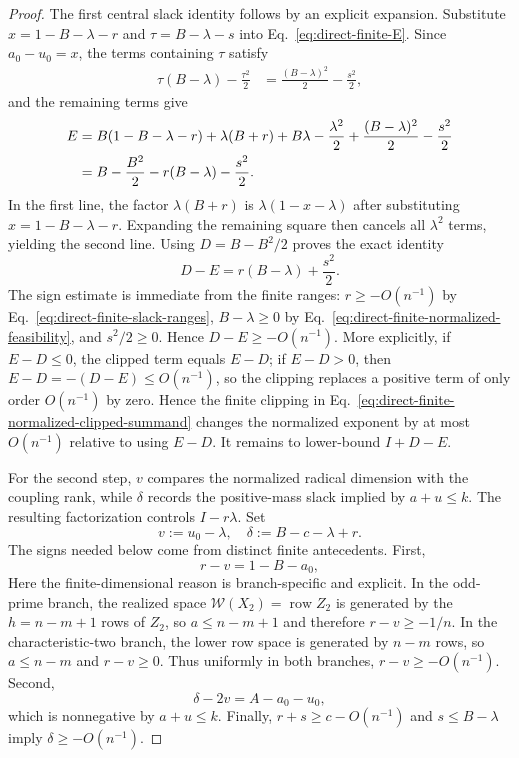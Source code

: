 \documentclass[11pt]{article}
\newcommand{\1}{\mathbf 1}
\theoremstyle{plain}
\theoremstyle{definition}
\theoremstyle{remark}
\begin{document}
\begin{proof}
The first central slack identity follows by an explicit expansion.  Substitute
$x=1-B-\lambda-r$ and $\tau=B-\lambda-s$ into
Eq.~\eqref{eq:direct-finite-E}.  Since $a_0-u_0=x$, the terms containing
$\tau$ satisfy
\begin{align}
 \tau(B-\lambda)-\frac{\tau^2}{2}
 &=\frac{(B-\lambda)^2}{2}-\frac{s^2}{2},
 \label{eq:direct-finite-visible-expansion-one}
\end{align}
and the remaining terms give
\begin{align}
 E
 &=B(1-B-\lambda-r)
   +\lambda(B+r)+B\lambda-\frac{\lambda^2}{2}
   +\frac{(B-\lambda)^2}{2}-\frac{s^2}{2}\notag\\
 &=B-\frac{B^2}{2}-r(B-\lambda)-\frac{s^2}{2}.
 \label{eq:direct-finite-visible-expansion-two}
\end{align}
In the first line, the factor $\lambda(B+r)$ is
$\lambda(1-x-\lambda)$ after substituting
$x=1-B-\lambda-r$.  Expanding the remaining square then cancels all
$\lambda^2$ terms, yielding the second line.  Using $D=B-B^2/2$ proves the
exact identity
\begin{equation}
 D-E=r(B-\lambda)+\frac{s^2}{2}.
 \label{eq:direct-finite-visible-deficit}
\end{equation}
The sign estimate is immediate from the finite ranges:
$r\ge-O(n^{-1})$ by Eq.~\eqref{eq:direct-finite-slack-ranges},
$B-\lambda\ge0$ by Eq.~\eqref{eq:direct-finite-normalized-feasibility}, and
$s^2/2\ge0$.  Hence $D-E\ge-O(n^{-1})$.  More explicitly, if $E-D\le0$, the
clipped term equals $E-D$; if $E-D>0$, then $E-D=-(D-E)\le O(n^{-1})$, so the clipping
replaces a positive term of only order $O(n^{-1})$ by zero.  Hence the finite clipping in
Eq.~\eqref{eq:direct-finite-normalized-clipped-summand} changes the normalized
exponent by at most $O(n^{-1})$ relative to using $E-D$.  It remains to
lower-bound $I+D-E$.

For the second step, $v$ compares the normalized radical dimension with the
coupling rank, while $\delta$ records the positive-mass slack implied by
$a+u\le k$.  The resulting factorization controls $I-r\lambda$.  Set
\begin{equation}
 v:=u_0-\lambda,
 \quad \delta:=B-c-\lambda+r.
 \label{eq:direct-finite-hidden-slacks}
\end{equation}
The signs needed below come from distinct finite antecedents.  First,
\begin{equation}
 r-v=1-B-a_0,
 \label{eq:direct-finite-r-minus-v}
\end{equation}
Here the finite-dimensional reason is branch-specific and explicit.  In the
odd-prime branch, the realized space $\mathcal W(X_2)=\operatorname{row}Z_2$
is generated by the $h=n-m+1$ rows of $Z_2$, so $a\le n-m+1$ and therefore
$r-v\ge-1/n$.  In the characteristic-two branch, the lower row space is generated by
$n-m$ rows, so $a\le n-m$ and $r-v\ge0$.  Thus uniformly in both branches,
$r-v\ge-O(n^{-1})$.  Second,
\begin{equation}
 \delta-2v=A-a_0-u_0,
 \label{eq:direct-finite-delta-minus-two-v}
\end{equation}
which is nonnegative by $a+u\le k$.  Finally,
$r+s\ge c-O(n^{-1})$ and $s\le B-\lambda$ imply
$\delta\ge-O(n^{-1})$.


\end{proof}
\end{document}

